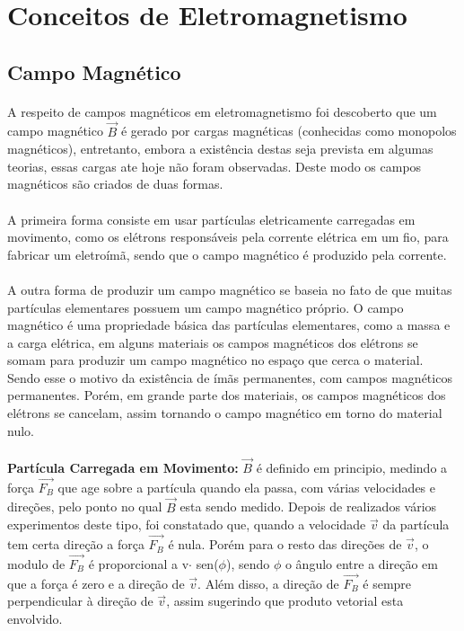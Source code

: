 \documentclass[a4paper, 12pt]{article}
\begin{document}
\section{Conceitos de Eletromagnetismo}
    \subsection{Campo Magnético}
\paragraph{}A respeito de campos magnéticos em eletromagnetismo foi descoberto que um campo magnético $\overrightarrow{B}$ é gerado por cargas magnéticas (conhecidas como monopolos magnéticos), entretanto, embora a existência destas seja prevista em algumas teorias, essas cargas ate hoje não foram observadas. Deste modo os campos magnéticos são criados de duas formas.

\paragraph{}A primeira forma consiste em usar partículas eletricamente carregadas em movimento, como os elétrons responsáveis pela corrente elétrica em um fio, para fabricar um eletroímã, sendo que o campo magnético é produzido pela corrente.

\paragraph{}A outra forma de produzir um campo magnético se baseia no fato de que muitas partículas elementares possuem um campo magnético próprio. O campo magnético é uma propriedade básica das partículas elementares, como a massa e a carga elétrica, em alguns materiais os campos magnéticos dos elétrons se somam para produzir um campo magnético no espaço que cerca o material. Sendo esse o motivo da existência de ímãs permanentes, com campos magnéticos permanentes. Porém, em grande parte dos materiais, os campos magnéticos dos elétrons se cancelam, assim tornando o campo magnético em torno do material nulo. 

\paragraph{}\textbf{Partícula Carregada em Movimento:} $\overrightarrow{B}$ é definido em principio, medindo a força $\overrightarrow{F_B}$ que age sobre a partícula quando ela passa, com várias velocidades e direções, pelo ponto no qual $\overrightarrow{B}$ esta sendo medido. Depois de realizados vários experimentos deste tipo, foi constatado que, quando a velocidade $\overrightarrow{v}$ da partícula tem certa direção a força $\overrightarrow{F_B}$ é nula. Porém para o resto das direções de $\overrightarrow{v}$, o modulo de $\overrightarrow{F_B}$ é proporcional a v$\cdot$ sen($\phi$), sendo $\phi$ o ângulo entre a direção em que a força é zero e a direção de $\overrightarrow{v}$. Além disso, a direção de $\overrightarrow{F_B}$ é sempre perpendicular à direção de $\overrightarrow{v}$, assim sugerindo que produto vetorial esta envolvido.
\end{document}

